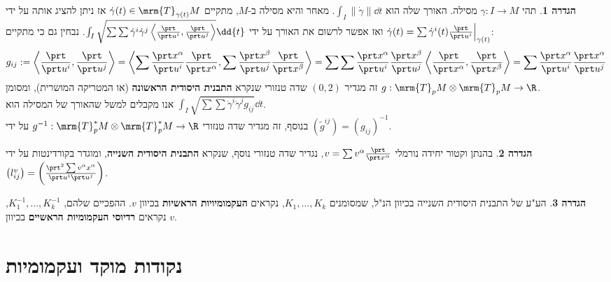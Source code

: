\documentclass{article}
\theoremstyle{definition}
\newtheorem*{definition*}{הגדרה}
\newcommand{\norm}[1]{\left\lVert#1\right\rVert}
\begin{document}
	\begin{definition*}
		תהי
		\(\gamma: I \to M\)
		מסילה.
		האורך שלה הוא
		\(\int_I \norm{\dot\gamma} \dd{t}\).
		מאחר והיא מסילה ב-\(M\), מתקיים
		\(\dot\gamma(t) \in \mrm{T}_{\gamma(t)} M\)
		אז ניתן להציג אותה על ידי
		\(\dot\gamma(t)=\sum \dot{\gamma}^i(t) \frac{\prt}{\prt u^i}\Big|_{\gamma(t)} \)
		ואז אפשר לרשום את האורך על ידי
		\(\int_I \sqrt{
			\sum \sum \dot{\gamma}^i \dot{\gamma}^j \left\langle \frac{\prt}{\prt u^i},\frac{\prt}{\prt u^j} \right\rangle
		} \dd{t}\).
		נבחין גם כי מתקיים:
		\[
			g_{ij}
			:=
			\left\langle \frac{\prt}{\prt u^i},\frac{\prt}{\prt u^j} \right\rangle
			=
			\left\langle
				\sum \frac{\prt x^\alpha}{\prt u^i} \frac{\prt}{\prt x^\alpha},
				\sum \frac{\prt x^\beta}{\prt u^j} \frac{\prt}{\prt x^\beta}
			\right\rangle
			=
			\sum \sum \frac{\prt x^\alpha}{\prt u^i} \frac{\prt x^\beta}{\prt u^j}
			\left\langle \frac{\prt}{\prt x^\alpha}, \frac{\prt}{\prt x^\beta} \right\rangle
			=
			\sum \frac{\prt x^\alpha}{\prt u^i} \frac{\prt x^\alpha}{\prt u^j}
		\]
		זה מגדיר
		\((0,2)\)
		שדה טנזורי שנקרא \textbf{התבנית היסודית הראשונה} (או המטריקה המושרית), ומסומן
		\(g: \mrm{T}_p M \otimes \mrm{T}_p M \to \R\).
		\\
		אנו מקבלים למשל שהאורך של המסילה הוא
		\(\int_I \sqrt{
			\sum \sum \dot{\gamma}^i \dot{\gamma}^j g_{ij}
		} \dd{t}\).
		\\
		בנוסף, זה מגדיר שדה טנזורי
		\(g^{-1}: \mrm{T}^*_p M \otimes \mrm{T}^*_p M \to \R\)
		על ידי
		\(\left(\tilde{g}^{ij}\right) = \left(g_{ij}\right)^{-1}\).
	\end{definition*}

	\begin{definition*}
		בהנתן וקטור יחידה נורמלי
		\(v=\sum v^\alpha \frac{\prt}{\prt x^\alpha}\),
		נגדיר שדה טנזורי נוסף, שנקרא \textbf{התבנית היסודית השנייה}, ומוגדר בקורדינטות על ידי
		\(\left(l_{ij}^v\right) = \left(\frac{\prt^2 \sum v^\alpha x^\alpha}{\prt u^i \prt u^j}\right)\).
	\end{definition*}

	\begin{definition*}
		הע"ע של התבנית היסודית השנייה בכיוון הנ"ל,
		שמסומנים
		\(K_1,\dotsc,K_k\),
		נקראים \textbf{העקמומיויות הראשיות} בכיוון \(v\).
		ההפכיים שלהם,
		\(K_1^{-1},\dotsc,K_k^{-1}\),
		נקראים \textbf{רדיוסי העקמומיות הראשיים} בכיוון \(v\).
	\end{definition*}




	\section{נקודות מוקד ועקמומיות}
	
\end{document}

